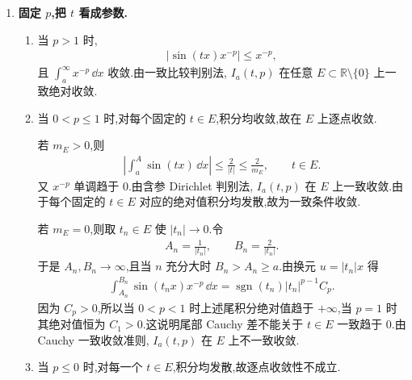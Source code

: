\begin{exbox}
\begin{enumerate}
		综上,当 $t\neq0$ 时,
		\begin{gather*}
			\int_a^\infty \sin(tx)x^{-p}\,\dd x
			\begin{cases}
				\text{绝对收敛},& p>1,\\[3pt]
				\text{条件收敛},& 0<p\leq1,\\[3pt]
				\text{发散},& p\leq0.
			\end{cases}
		\end{gather*}

		\item \textbf{固定 $p$,把 $t$ 看成参数.}

		\begin{enumerate}
			\item 当 $p>1$ 时,
			\begin{align*}
				|\sin(tx)x^{-p}|\leq x^{-p},
			\end{align*}
			且 $\int_a^\infty x^{-p}\,\dd x$ 收敛.由一致比较判别法, $I_a(t,p)$ 在任意 $E\subset\mathbb R\setminus\{0\}$ 上一致绝对收敛.

			\item 当 $0<p\leq1$ 时,对每个固定的 $t\in E$,积分均收敛,故在 $E$ 上逐点收敛.

			若 $m_E>0$,则
			\begin{align*}
				\left|\int_a^A\sin(tx)\,\dd x\right|
				\leq \frac{2}{|t|}
				\leq \frac{2}{m_E},
				\qquad t\in E.
			\end{align*}
			又 $x^{-p}$ 单调趋于 $0$.由含参 Dirichlet 判别法, $I_a(t,p)$ 在 $E$ 上一致收敛.由于每个固定的 $t\in E$ 对应的绝对值积分均发散,故为一致条件收敛.

			若 $m_E=0$,则取 $t_n\in E$ 使 $|t_n|\to0$.令
			\begin{align*}
				A_n=\frac1{|t_n|},
				\qquad
				B_n=\frac2{|t_n|}.
			\end{align*}
			于是 $A_n,B_n\to\infty$,且当 $n$ 充分大时 $B_n>A_n\geq a$.由换元 $u=|t_n|x$ 得
			\begin{align*}
				\int_{A_n}^{B_n}\sin(t_nx)x^{-p}\,\dd x
				=
				\operatorname{sgn}(t_n)|t_n|^{p-1}C_p.
			\end{align*}
			因为 $C_p>0$,所以当 $0<p<1$ 时上述尾积分绝对值趋于 $+\infty$,当 $p=1$ 时其绝对值恒为 $C_1>0$.这说明尾部 Cauchy 差不能关于 $t\in E$ 一致趋于 $0$.由 Cauchy 一致收敛准则, $I_a(t,p)$ 在 $E$ 上不一致收敛.

			\item 当 $p\leq0$ 时,对每一个 $t\in E$,积分均发散,故逐点收敛性不成立.
		\end{enumerate}


\end{enumerate}
\end{exbox}
